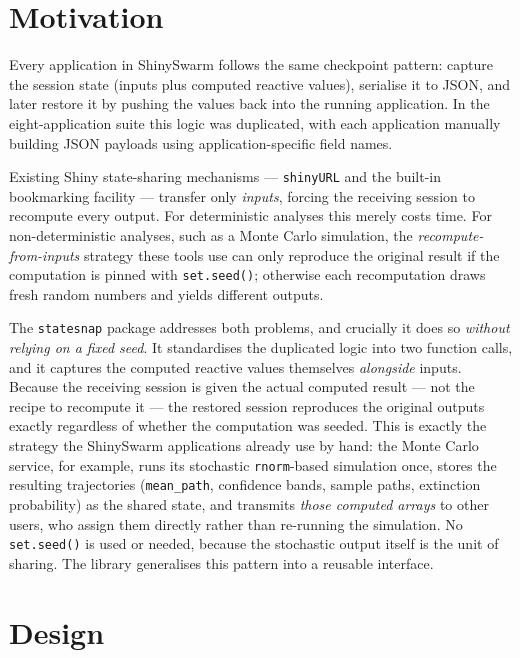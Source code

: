 \documentclass[11pt,a4paper]{article}
\begin{document}
\section{Motivation}

Every application in ShinySwarm follows the same checkpoint pattern: capture the
session state (inputs plus computed reactive values), serialise it to JSON, and
later restore it by pushing the values back into the running application. In the
eight-application suite this logic was duplicated, with each application manually
building JSON payloads using application-specific field names.

Existing Shiny state-sharing mechanisms --- \texttt{shinyURL} and the built-in
bookmarking facility --- transfer only \emph{inputs}, forcing the receiving
session to recompute every output. For deterministic analyses this merely costs
time. For non-deterministic analyses, such as a Monte Carlo simulation, the
\emph{recompute-from-inputs} strategy these tools use can only reproduce the
original result if the computation is pinned with \texttt{set.seed()}; otherwise
each recomputation draws fresh random numbers and yields different outputs.

The \texttt{statesnap} package addresses both problems, and crucially it does so
\emph{without relying on a fixed seed}. It standardises the duplicated logic into
two function calls, and it captures the computed reactive values themselves
\emph{alongside} inputs. Because the receiving session is given the actual
computed result --- not the recipe to recompute it --- the restored session
reproduces the original outputs exactly regardless of whether the computation was
seeded. This is exactly the strategy the ShinySwarm applications already use by
hand: the Monte Carlo service, for example, runs its stochastic
\texttt{rnorm}-based simulation once, stores the resulting trajectories
(\texttt{mean\_path}, confidence bands, sample paths, extinction probability) as
the shared state, and transmits \emph{those computed arrays} to other users, who
assign them directly rather than re-running the simulation. No \texttt{set.seed()}
is used or needed, because the stochastic output itself is the unit of sharing.
The library generalises this pattern into a reusable interface.

\section{Design}
\label{sec:design}
\end{document}
